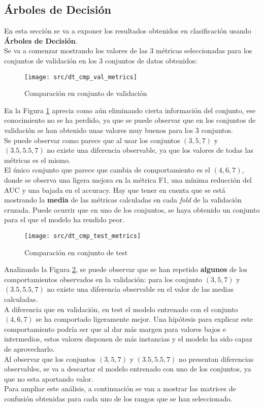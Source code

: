 \subsection{Árboles de Decisión}
\label{class:dt1}
En esta sección se va a exponer los resultados obtenidos en clasificación usando \textbf{Árboles de Decisión}.\\
Se va a comenzar mostrando los valores de las 3 métricas seleccionadas para los conjuntos de validación en los 3 conjuntos de datos obtenidos:
\begin{figure}[H]
	\centering
	\texttt{[image: src/dt\_cmp\_val\_metrics]}
	\caption{Comparación en conjunto de validación}
	\label{fig:dtre_class_val}
\end{figure}
En la Figura \ref{fig:dtre_class_val} aprecia como aún eliminando cierta información del conjunto, ese conocimiento no se ha perdido, ya que se puede observar que en los conjuntos de validación se han obtenido unas valores muy buenos para los 3 conjuntos. \\
\linebreak
Se puede observar como parece que al usar los conjuntos $(3,5,7)$ y $(3.5,5.5,7)$ no existe una diferencia observable, ya que los valores de todas las métricas es el mismo. \\
El único conjunto que parece que cambia de comportamiento es el $(4,6,7)$, donde se observa una ligera mejora en la métrica F1, una mínima reducción del AUC y una bajada en el accuracy. Hay que tener en cuenta que se está mostrando la \textbf{media} de las métricas calculadas en cada \textit{fold} de la validación cruzada. Puede ocurrir que en uno de los conjuntos, se haya obtenido un conjunto para el que el modelo ha rendido peor.
\clearpage
\begin{figure}[H]
	\centering
	\texttt{[image: src/dt\_cmp\_test\_metrics]}
	\caption{Comparación en conjunto de test}
	\label{fig:dtre_class_testl}
\end{figure}
Analizando la Figura \ref{fig:dtre_class_testl}, se puede observar que se han repetido \textbf{algunos} de los comportamientos observados en la validación: para los conjunto $(3,5,7)$ y $(3.5,5.5,7)$ no existe una diferencia observable en el valor de las medias calculadas. \\
A diferencia que en validación, en test el modelo entrenado con el conjunto $(4,6,7)$ se ha comportado ligeramente mejor. Una hipótesis para explicar este comportamiento podría ser que al dar más margen para valores bajos e intermedios, estos valores disponen de más instancias y el modelo ha sido capaz de aprovecharlo.\\
\linebreak
Al observar que los conjuntos $(3,5,7)$ y $(3.5,5.5,7)$ no presentan diferencias observables, se va a descartar el modelo entrenado con uno de los conjuntos, ya que no esta aportando valor.\\
\linebreak
Para ampliar este análisis, a continuación se van a mostrar las matrices de confusión obtenidas para cada uno de los rangos que se han seleccionado.
\clearpage
